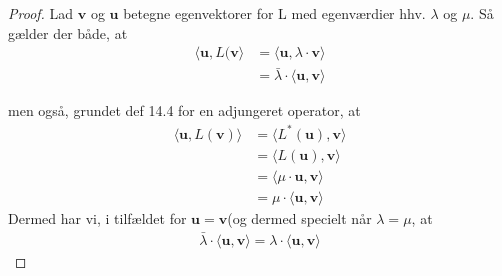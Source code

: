\documentclass[paper=a4, fontsize=11pt]{scrartcl} %
\begin{document}
	\begin{proof} Lad $\mathbf{v}$ og $\mathbf{u}$ betegne egenvektorer for L med egenværdier hhv. $\lambda$ og $\mu$. Så gælder der både, at
		\begin{align*}
			\langle \mathbf{u},L(\mathbf{v}\rangle&=\langle\mathbf{u},\lambda\cdot\mathbf{v}\rangle\\
			&=\bar{\lambda}\cdot\langle\mathbf{u},\mathbf{v}\rangle
		\end{align*}
		
		men også, grundet def 14.4 for en adjungeret operator, at
		\begin{align*}
			\langle\mathbf{u},L(\mathbf{v})\rangle&=\langle L^*(\mathbf{u}),\mathbf{v}\rangle \\
			&=\langle L(\mathbf{u}),\mathbf{v}\rangle \\
			&=\langle \mu\cdot\mathbf{u},\mathbf{v}\rangle \\
			&=\mu \cdot \langle\mathbf{u},\mathbf{v}\rangle 
		\end{align*}
		Dermed har vi, i tilfældet for $\mathbf{u}=\mathbf{v}$(og dermed specielt når $\lambda=\mu$, at
		\begin{align*}
			\bar{\lambda}\cdot\langle\mathbf{u},\mathbf{v}\rangle=\lambda\cdot\langle\mathbf{u},\mathbf{v}\rangle
		\end{align*}
	\end{proof}
	
\end{document}
